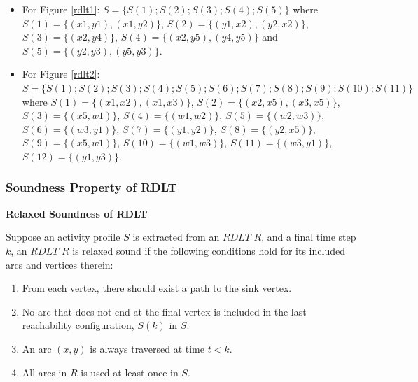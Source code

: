 \documentclass[12pt]{article}
\begin{document}
        \begin{itemize}
            
            \item For Figure \ref{rdlt1}: $S = \{S(1);S(2);S(3);S(4);S(5)\}$ where $S(1) = \{(x1,y1),(x1,y2)\}$, $S(2) = \{(y1,x2),(y2,x2)\}$, $S(3) = \{(x2,y4)\}$, $S(4) = \{(x2,y5),(y4,y5)\}$ and $S(5) = \{(y2,y3),(y5,y3)\}$. 

            \item For Figure \ref{rdlt2}: $S = \{S(1);S(2);S(3);S(4);S(5);S(6);S(7);S(8);S(9);S(10);S(11)\}$ where $S(1) = \{(x1,x2),(x1,x3)\}$, $S(2) = \{(x2,x5),(x3,x5)\}$, $S(3) = \{(x5,w1)\}$, $S(4) = \{(w1,w2)\}$, $S(5) = \{(w2,w3)\}$, $S(6) = \{(w3,y1)\}$, $S(7) = \{(y1,y2)\}$, $S(8) = \{(y2,x5)\}$, $S(9) = \{(x5,w1)\}$, $S(10) = \{(w1,w3)\}$, $S(11) = \{(w3,y1)\}$, $S(12) = \{(y1,y3)\}$.
        
        \end{itemize}

        \subsubsection*{Soundness Property of RDLT}

        \begin{definition} \textbf{Relaxed Soundness of RDLT} \cite{malinao-rdlt}

        Suppose an activity profile $S$ is extracted from an $RDLT$ $R$, and a final time step $k$, an $RDLT$ $R$ is relaxed sound if the following conditions hold for its included arcs and vertices therein:

        \begin{enumerate}
            
            \item From each vertex, there should exist a path to the sink vertex.

            \item No arc that does not end at the final vertex is included in the last reachability configuration, $S(k)$ in $S$.

            \item An arc $(x,y)$ is always traversed at time $t < k$.

            \item All arcs in $R$ is used at least once in $S$.
            
        \end{enumerate}
            
        \end{definition}
\end{document}
